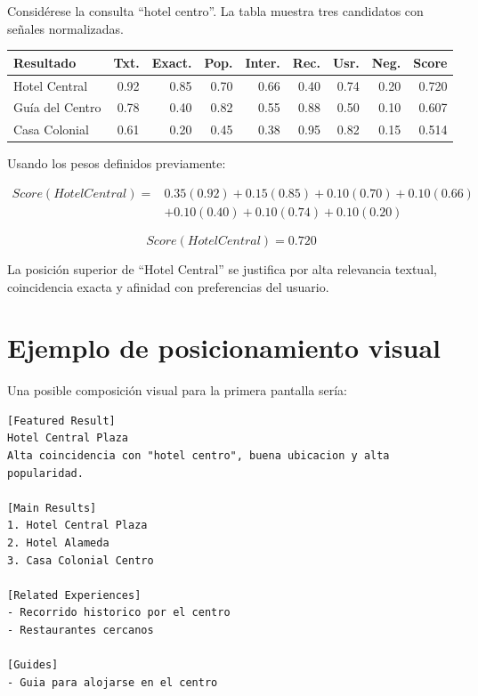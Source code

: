 \documentclass[12pt,a4paper]{article}
\begin{document}
Considérese la consulta ``hotel centro''. La tabla muestra tres candidatos con señales normalizadas.

{\scriptsize
\setlength{\tabcolsep}{2.5pt}
\begin{longtable}{@{}p{2.4cm}rrrrrrrr@{}}
\toprule
\textbf{Resultado} & \textbf{Txt.} & \textbf{Exact.} & \textbf{Pop.} & \textbf{Inter.} & \textbf{Rec.} & \textbf{Usr.} & \textbf{Neg.} & \textbf{Score} \\
\midrule
\endhead

Hotel Central & 0.92 & 0.85 & 0.70 & 0.66 & 0.40 & 0.74 & 0.20 & 0.720 \\

Guía del Centro & 0.78 & 0.40 & 0.82 & 0.55 & 0.88 & 0.50 & 0.10 & 0.607 \\

Casa Colonial & 0.61 & 0.20 & 0.45 & 0.38 & 0.95 & 0.82 & 0.15 & 0.514 \\

\bottomrule
\end{longtable}
}

Usando los pesos definidos previamente:

\[
\begin{aligned}
Score(HotelCentral) ={}&
0.35(0.92) +
0.15(0.85) +
0.10(0.70) +
0.10(0.66) \\
&+
0.10(0.40) +
0.10(0.74) +
0.10(0.20)
\end{aligned}
\]

\[
Score(HotelCentral) = 0.720
\]

La posición superior de ``Hotel Central'' se justifica por alta relevancia textual, coincidencia exacta y afinidad con preferencias del usuario.

\section{Ejemplo de posicionamiento visual}

Una posible composición visual para la primera pantalla sería:

\begin{lstlisting}[caption={Ejemplo conceptual de layout}]
[Featured Result]
Hotel Central Plaza
Alta coincidencia con "hotel centro", buena ubicacion y alta popularidad.

[Main Results]
1. Hotel Central Plaza
2. Hotel Alameda
3. Casa Colonial Centro

[Related Experiences]
- Recorrido historico por el centro
- Restaurantes cercanos

[Guides]
- Guia para alojarse en el centro
\end{lstlisting}
\end{document}
